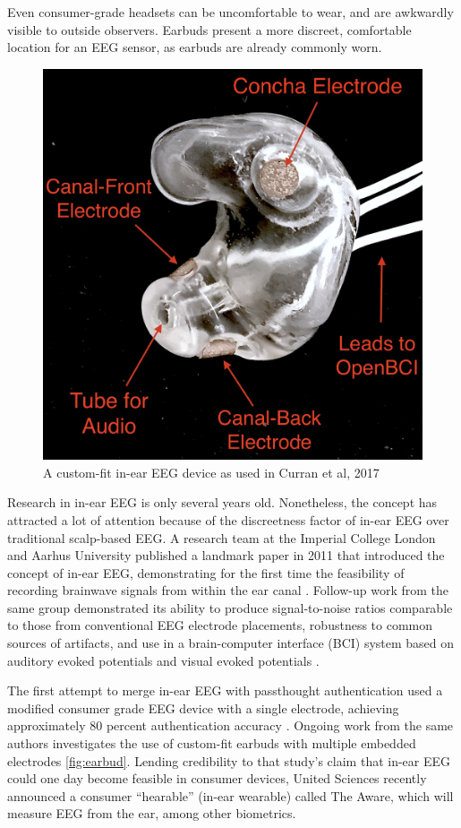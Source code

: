 \documentclass[sigconf]{acmart}
\begin{document}
Even consumer-grade headsets can be uncomfortable to wear, and are awkwardly visible to outside observers. 
Earbuds present a more discreet, comfortable location for an EEG sensor, as earbuds are already commonly worn.

\label{fig:earbud}
\begin{figure}[t!]
\centering
\includegraphics[width=.9\linewidth]{./figures/custom-fit-eeg-annotated.jpg}
\caption{A custom-fit in-ear EEG device as used in Curran et al, 2017}
\end{figure}

Research in in-ear EEG is only several years old. Nonetheless, the concept has
attracted a lot of attention because of the discreetness factor of in-ear EEG over
traditional scalp-based EEG. A research team at the Imperial College London
and Aarhus University published a landmark paper in 2011 that introduced the
concept of in-ear EEG, demonstrating for the first time the feasibility of recording
brainwave signals from within the ear canal
\cite{Looney2011}.
Follow-up work from the same
group demonstrated its ability to produce signal-to-noise ratios comparable to
those from conventional EEG electrode placements, robustness to common
sources of artifacts, and use in a brain-computer interface (BCI) system based on
auditory evoked potentials and visual evoked potentials
\cite{Looney2012a,Kidmose2013a,Kidmose2013b}.

The first attempt to merge in-ear EEG with passthought authentication
used a modified consumer grade EEG device with a single electrode, achieving approximately 80 percent authentication accuracy \cite{curranpassthoughts}.
Ongoing work from the same authors investigates the use of custom-fit earbuds with multiple embedded electrodes \ref{fig:earbud}.
Lending credibility to that study's claim that in-ear EEG could one day become feasible in consumer devices,
United Sciences recently announced a consumer ``hearable'' (in-ear wearable) called The Aware, which will measure EEG from the ear, among other biometrics.
\end{document}
